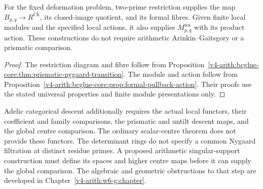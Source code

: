\begin{proposition}
\label{v4-arith:bcglue-core:cor:LACD-tightened}
For the fixed deformation problem, two-prime restriction supplies
the map $B_{p,q}\to R^{\mathrm{Ch}}$, its closed-image quotient,
and its formal fibres. Given finite local modules and the specified
local actions, it also supplies $M_{p,q}^{\mathrm{res}}$ with its
product action. These constructions do not require arithmetic
Arinkin--Gaitsgory or a prismatic comparison.
\end{proposition}

\begin{proof}
The restriction diagram and fibre follow from
Proposition~\ref{v4-arith:bcglue-core:thm:prismatic-nygaard-transition}.
The module and action follow from
Proposition~\ref{v4-arith:bcglue-core:prop:formal-pullback-action}.
Their proofs use the stated universal properties and finite module
presentations only.
\end{proof}

\begin{remark}
\label{v4-arith:bcglue-core:rem:domain-delta}
\label{v4-arith:bcglue-core:rem:realization-discipline}
Adelic categorical descent additionally requires the actual local
functors, their coefficient and family comparisons, the prismatic
and untilt descent maps, and the global centre comparison.
The ordinary scalar-centre theorem does not provide these functors.
The determinant rings do not specify a common Nygaard filtration
at distinct residue primes. A proposed arithmetic singular-support
construction must define its spaces and higher centre maps before
it can supply the global comparison. The algebraic and geometric
obstructions to that step are developed in
Chapter~\ref{v4-arith:w6-g:chapter}.
\end{remark}
